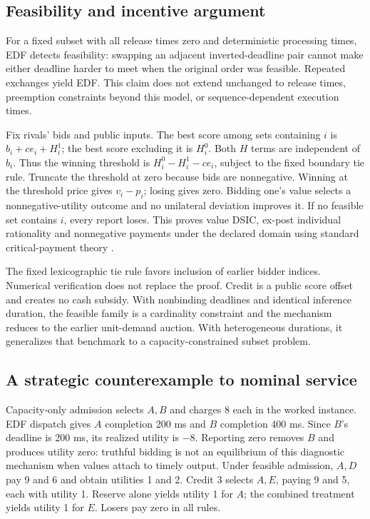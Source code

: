 \subsection{Feasibility and incentive argument}
For a fixed subset with all release times zero and deterministic processing times, EDF detects feasibility: swapping an adjacent inverted-deadline pair cannot make either deadline harder to meet when the original order was feasible. Repeated exchanges yield EDF. This claim does not extend unchanged to release times, preemption constraints beyond this model, or sequence-dependent execution times.

Fix rivals' bids and public inputs. The best score among sets containing $i$ is $b_i+ce_i+H_i^1$; the best score excluding it is $H_i^0$. Both $H$ terms are independent of $b_i$. Thus the winning threshold is $H_i^0-H_i^1-ce_i$, subject to the fixed boundary tie rule. Truncate the threshold at zero because bids are nonnegative. Winning at the threshold price gives $v_i-p_i$; losing gives zero. Bidding one's value selects a nonnegative-utility outcome and no unilateral deviation improves it. If no feasible set contains $i$, every report loses. This proves value DSIC, ex-post individual rationality and nonnegative payments under the declared domain using standard critical-payment theory \cite{roughgarden}.

The fixed lexicographic tie rule favors inclusion of earlier bidder indices. Numerical verification does not replace the proof. Credit is a public score offset and creates no cash subsidy. With nonbinding deadlines and identical inference duration, the feasible family is a cardinality constraint and the mechanism reduces to the earlier unit-demand auction. With heterogeneous durations, it generalizes that benchmark to a capacity-constrained subset problem.

\subsection{A strategic counterexample to nominal service}
Capacity-only admission selects $A,B$ and charges 8 each in the worked instance. EDF dispatch gives $A$ completion 200 ms and $B$ completion 400 ms. Since $B$'s deadline is 200 ms, its realized utility is $-8$. Reporting zero removes $B$ and produces utility zero: truthful bidding is not an equilibrium of this diagnostic mechanism when values attach to timely output. Under feasible admission, $A,D$ pay 9 and 6 and obtain utilities 1 and 2. Credit 3 selects $A,E$, paying 9 and 5, each with utility 1. Reserve alone yields utility 1 for $A$; the combined treatment yields utility 1 for $E$. Losers pay zero in all rules.

